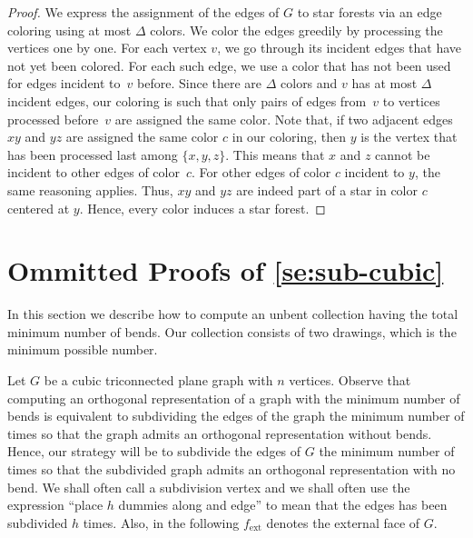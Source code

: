 \documentclass[runningheads]{llncs}
\newcommand{\ext}{\operatorname{ext}}
\let\emph\relax\DeclareTextFontCommand{\emph}{\color{dark blue}\em}
\begin{document}
\begin{proof}
    We express the assignment of the edges of $G$ to
    star forests via an edge coloring using at most $\Delta$ colors. 
    We color the edges greedily by processing the vertices one by one.
    For each vertex $v$, we go through its incident edges that have not yet been colored.  
    For each such edge, we use a color that has not been used for edges incident to~$v$ before. 
    Since there are $\Delta$ colors and $v$ has at most $\Delta$ incident edges, our coloring is such that only pairs of edges from~$v$ to vertices processed before~$v$ are assigned the same color. 
    Note that, if two adjacent edges $xy$ and $yz$ are assigned the same color $c$ in our coloring, then $y$ is the vertex that has been processed last among $\{x,y,z\}$. 
    This means that $x$ and $z$ cannot be incident to other edges of color~$c$. 
    For other edges of color $c$ incident to $y$, the same reasoning applies. 
    Thus, $xy$ and $yz$ are indeed part of a star in color $c$ centered at $y$.
    Hence, every color induces a star forest.
\end{proof}





\section{Ommitted Proofs of \cref{se:sub-cubic}}
\label{se-ap:sub-cubic}

In this section we describe how to compute an unbent collection having the total minimum number of bends. Our collection  consists of two drawings, which is the minimum possible number. 

Let $G$ be a cubic triconnected plane graph with $n$ vertices. Observe that computing an orthogonal representation of a graph with the minimum number of bends is equivalent to subdividing the edges of the graph the minimum number of times so that the graph admits an orthogonal representation without bends. Hence, our strategy will be to subdivide the edges of $G$ the minimum number of times so that the subdivided graph admits an orthogonal representation with no bend. We shall often call \emph{dummy} a subdivision vertex and we shall often use the expression ``place $h$ dummies along and edge'' to mean that the edges has been subdivided $h$ times. Also, in the following $f_{\ext}$ denotes the external face of $G$.
\end{document}
